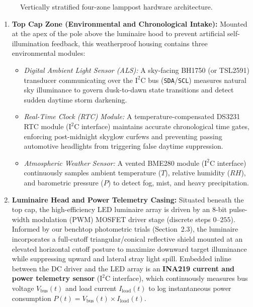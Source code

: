 \documentclass[11pt,a4paper]{article}
\begin{document}
\begin{figure}[tbp]
\caption{Vertically stratified four-zone lamppost hardware architecture.}
\label{fig:pole_zones}
\end{figure}

\begin{enumerate}
    \item \textbf{Top Cap Zone (Environmental and Chronological Intake):} Mounted at the apex of the pole above the luminaire hood to prevent artificial self-illumination feedback, this weatherproof housing contains three environmental modules:
    \begin{itemize}
        \item \textit{Digital Ambient Light Sensor (ALS):} A sky-facing BH1750 (or TSL2591) transducer communicating over the \(\text{I}^2\text{C}\) bus (\texttt{SDA}/\texttt{SCL}) measures natural sky illuminance to govern dusk-to-dawn state transitions and detect sudden daytime storm darkening.
        \item \textit{Real-Time Clock (RTC) Module:} A temperature-compensated DS3231 RTC module (\(\text{I}^2\text{C}\) interface) maintains accurate chronological time gates, enforcing post-midnight skyglow curfews and preventing passing automotive headlights from triggering false daytime suppression.
        \item \textit{Atmospheric Weather Sensor:} A vented BME280 module (\(\text{I}^2\text{C}\) interface) continuously samples ambient temperature (\(T\)), relative humidity (\(RH\)), and barometric pressure (\(P\)) to detect fog, mist, and heavy precipitation.
    \end{itemize}
    \item \textbf{Luminaire Head and Power Telemetry Casing:} Situated beneath the top cap, the high-efficiency LED luminaire array is driven by an 8-bit pulse-width modulation (PWM) MOSFET driver stage (discrete steps \(0\text{--}255\)). Informed by our benchtop photometric trials (Section~2.3), the luminaire incorporates a full-cutoff triangular/conical reflective shield mounted at an elevated horizontal cutoff posture to maximize downward target illuminance while suppressing upward and lateral stray light spill. Embedded inline between the DC driver and the LED array is an \textbf{INA219 current and power telemetry sensor} (\(\text{I}^2\text{C}\) interface), which continuously measures bus voltage \(V_{\text{bus}}(t)\) and load current \(I_{\text{load}}(t)\) to log instantaneous power consumption \(P(t) = V_{\text{bus}}(t) \times I_{\text{load}}(t)\).

\end{enumerate}
\end{document}
